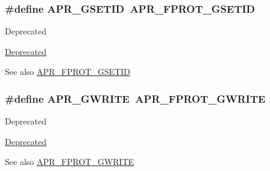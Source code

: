 \subsubsection[{\texorpdfstring{A\+P\+R\+\_\+\+G\+S\+E\+T\+ID}{APR_GSETID}}]{\setlength{\rightskip}{0pt plus 5cm}\#define A\+P\+R\+\_\+\+G\+S\+E\+T\+ID~{\bf A\+P\+R\+\_\+\+F\+P\+R\+O\+T\+\_\+\+G\+S\+E\+T\+ID}}\hypertarget{group__apr__file__permissions_ga4e4e9bb05f2bb156b174461551c9c329}{}\label{group__apr__file__permissions_ga4e4e9bb05f2bb156b174461551c9c329}
\begin{DoxyRefDesc}{Deprecated}
\item[\hyperlink{deprecated__deprecated000007}{Deprecated}]\end{DoxyRefDesc}
\begin{DoxySeeAlso}{See also}
\hyperlink{group__apr__file__permissions_ga5fcf6746afdd4e9b8be6ceab6892a3f5}{A\+P\+R\+\_\+\+F\+P\+R\+O\+T\+\_\+\+G\+S\+E\+T\+ID} 
\end{DoxySeeAlso}
\subsubsection[{\texorpdfstring{A\+P\+R\+\_\+\+G\+W\+R\+I\+TE}{APR_GWRITE}}]{\setlength{\rightskip}{0pt plus 5cm}\#define A\+P\+R\+\_\+\+G\+W\+R\+I\+TE~{\bf A\+P\+R\+\_\+\+F\+P\+R\+O\+T\+\_\+\+G\+W\+R\+I\+TE}}\hypertarget{group__apr__file__permissions_ga794c425b459aa46939f6febabbe9daef}{}\label{group__apr__file__permissions_ga794c425b459aa46939f6febabbe9daef}
\begin{DoxyRefDesc}{Deprecated}
\item[\hyperlink{deprecated__deprecated000009}{Deprecated}]\end{DoxyRefDesc}
\begin{DoxySeeAlso}{See also}
\hyperlink{group__apr__file__permissions_gacecdc9f88b04c768150418688b786500}{A\+P\+R\+\_\+\+F\+P\+R\+O\+T\+\_\+\+G\+W\+R\+I\+TE} 
\end{DoxySeeAlso}
